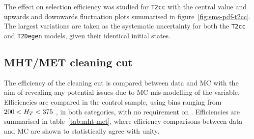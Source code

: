 The effect on selection efficiency was studied for \texttt{T2cc} with the
central value and upwards and downwards fluctuation plots summarised in
figure~\ref{fig:sms-pdf-t2cc}. The largest variations are taken as the
systematic uncertainty for both the \texttt{T2cc} and \texttt{T2Degen} models,
given their identical initial states.

\subsection{MHT/MET cleaning cut}
\label{sec:mhtmet_syst}
The efficiency of the \mhtmet cleaning cut is compared between data and MC with 
the aim of revealing any potential issues due to MC mis-modelling of the 
variable. Efficiencies are compared in the \mj control sample, using \HT bins 
ranging from $200 < H_T < 375$ \gev, in both \nj categories, with no requirement
on \nb. Efficiencies are summarised in table~\ref{tab:mht-met}, where 
efficiency comparisons between data and MC are shown to statistically agree
with unity.



